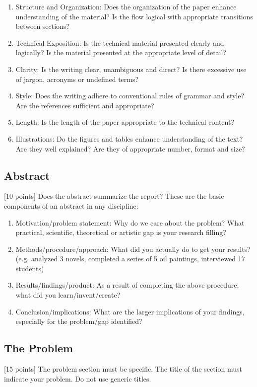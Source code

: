 \documentclass{winslabreport}
\begin{document}
\begin{enumerate}
\item Structure and Organization: Does the organization of the paper enhance understanding of the material? Is the flow logical with appropriate transitions between sections?
\item Technical Exposition: Is the technical material presented clearly and logically? Is the material presented at the appropriate level of detail?
\item  Clarity: Is the writing clear, unambiguous and direct? Is there excessive use of jargon, acronyms or undefined terms?
\item Style: Does the writing adhere to conventional rules of grammar and style? Are the references sufficient and appropriate?
\item Length: Is the length of the paper appropriate to the technical content? 
\item Illustrations: Do the figures and tables enhance understanding of the text? Are they well explained? Are they of appropriate number, format and size?
\end{enumerate}


\subsection{Abstract}
[10 points] Does the abstract summarize the report? These are the basic components of an abstract in any discipline:

\begin{enumerate}
\item Motivation/problem statement: Why do we care about the problem? What practical, scientific, theoretical or artistic gap is your research filling?
\item  Methods/procedure/approach: What did you actually do to get your results? (e.g. analyzed 3 novels, completed a series of 5 oil paintings, interviewed 17 students)
\item Results/findings/product: As a result of completing the above procedure, what did you learn/invent/create?
\item Conclusion/implications: What are the larger implications of your findings, especially for the problem/gap identified? 
\end{enumerate}

\subsection{The Problem}
[15 points] The problem section must be specific. The title of the section must indicate your problem. Do not use generic titles.
\end{document}
